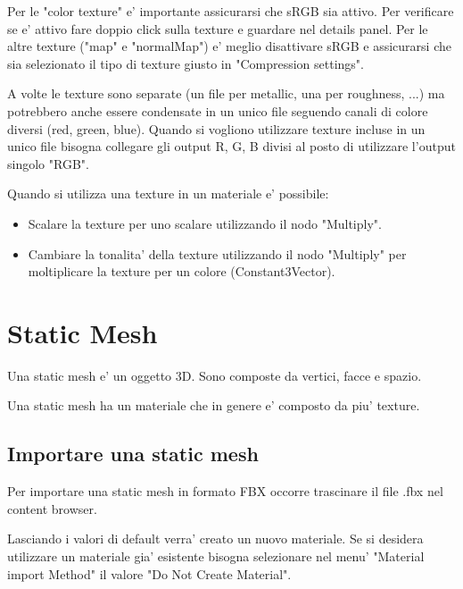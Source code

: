             \begin{notebox}
                Per le "color texture" e' importante assicurarsi che sRGB sia attivo. Per verificare se e' attivo fare doppio click sulla texture e guardare nel details panel. Per le altre texture ("map" e "normalMap") e' meglio disattivare sRGB e assicurarsi che sia selezionato il tipo di texture giusto in "Compression settings".
            \end{notebox}

            \begin{notebox}
                A volte le texture sono separate (un file per metallic, una per roughness, ...) ma potrebbero anche essere condensate in un unico file seguendo canali di colore diversi (red, green, blue). Quando si vogliono utilizzare texture incluse in un unico file bisogna collegare gli output R, G, B divisi al posto di utilizzare l'output singolo "RGB".
            \end{notebox}

            Quando si utilizza una texture in un materiale e' possibile:
            \begin{itemize}
                \item Scalare la texture per uno scalare utilizzando il nodo "Multiply".
                \item Cambiare la tonalita' della texture utilizzando il nodo "Multiply" per moltiplicare la texture per un colore (Constant3Vector).
            \end{itemize}


    \section{Static Mesh}

        Una static mesh e' un oggetto 3D. Sono composte da vertici, facce e spazio.

        Una static mesh ha un materiale che in genere e' composto da piu' texture.

        \subsection{Importare una static mesh}
            Per importare una static mesh in formato FBX occorre trascinare il file .fbx nel content browser.

            Lasciando i valori di default verra' creato un nuovo materiale. Se si desidera utilizzare un materiale gia' esistente bisogna selezionare nel menu' "Material import Method" il valore "Do Not Create Material".

